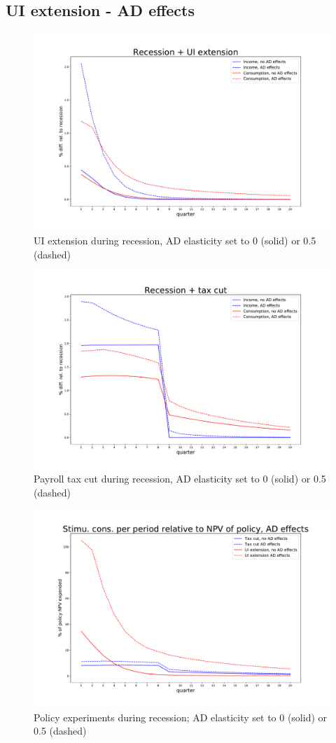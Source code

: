 \documentclass[]{article}
\begin{document}
\FloatBarrier
\subsection{UI extension - AD effects}



\begin{figure}[h]
	\centering
	\includegraphics[width=0.7\linewidth]{../UI_AD05_new/recession_UI_relrecession}
	\caption{UI extension during recession, AD elasticity set to 0 (solid) or 0.5 (dashed)}
	\label{fig:recessionuirelrecession}
\end{figure}

\begin{figure}[h]
	\centering
	\includegraphics[width=0.7\linewidth]{../Full_Run_Mar5/recession_taxcut_relrecession}
	\caption{Payroll tax cut during recession, AD elasticity set to 0 (solid) or 0.5 (dashed)}
	\label{fig:recessiontaxcutrelrecession_statedep}
\end{figure}

\begin{figure}
	\centering
	\includegraphics[width=0.7\linewidth]{../UI_AD02/Stimulus_TaxCut_AD}
	\caption{Policy experiments during recession; AD elasticity set to 0 (solid) or 0.5 (dashed)}
	\label{fig:npvmultipliernoad}
\end{figure}
\end{document}

